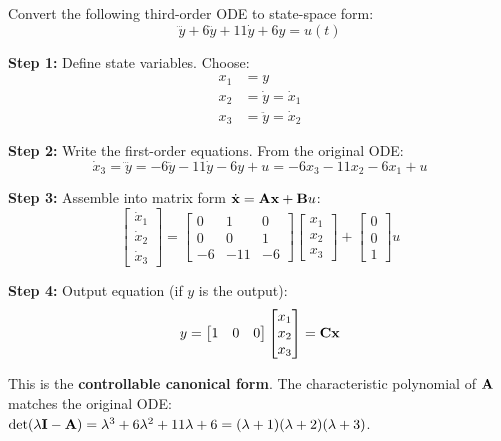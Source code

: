 \begin{examplebox}[title=Example: Converting 3rd Order ODE to State-Space Form]
Convert the following third-order ODE to state-space form:
\begin{equation}
\dddot{y} + 6\ddot{y} + 11\dot{y} + 6y = u(t)
\end{equation}

\textbf{Step 1:} Define state variables. Choose:
\begin{align}
x_1 &= y \\
x_2 &= \dot{y} = \dot{x}_1 \\
x_3 &= \ddot{y} = \dot{x}_2
\end{align}

\textbf{Step 2:} Write the first-order equations. From the original ODE:
\begin{equation}
\dot{x}_3 = \dddot{y} = -6\ddot{y} - 11\dot{y} - 6y + u = -6x_3 - 11x_2 - 6x_1 + u
\end{equation}

\textbf{Step 3:} Assemble into matrix form $\dot{\mathbf{x}} = \mathbf{A}\mathbf{x} + \mathbf{B} u$:
\begin{equation}
\begin{bmatrix} \dot{x}_1 \\ \dot{x}_2 \\ \dot{x}_3 \end{bmatrix} =
\begin{bmatrix} 0 & 1 & 0 \\ 0 & 0 & 1 \\ -6 & -11 & -6 \end{bmatrix}
\begin{bmatrix} x_1 \\ x_2 \\ x_3 \end{bmatrix} +
\begin{bmatrix} 0 \\ 0 \\ 1 \end{bmatrix} u
\end{equation}

\textbf{Step 4:} Output equation (if $y$ is the output):
\begin{equation}
y = \begin{bmatrix} 1 & 0 & 0 \end{bmatrix} \begin{bmatrix} x_1 \\ x_2 \\ x_3 \end{bmatrix} = \mathbf{C}\mathbf{x}
\end{equation}

This is the \textbf{controllable canonical form}. The characteristic polynomial of $\mathbf{A}$ matches the original ODE: $\det(\lambda\mathbf{I} - \mathbf{A}) = \lambda^3 + 6\lambda^2 + 11\lambda + 6 = (\lambda + 1)(\lambda + 2)(\lambda + 3)$.
\end{examplebox}

